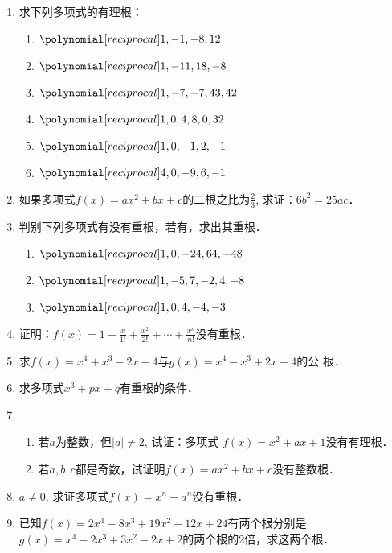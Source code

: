 \begin{enumerate}
    \item 求下列多项式的有理根：
\begin{multicols}{2}
\begin{enumerate}
    \item $\poly{1,-1,-8,12}$
    \item $\poly{1,-11,18,-8}$
    \item $\poly{1,-7,-7,43,42}$
    \item $\poly{1,0,4,8,0,32}$
    \item $\poly{1,0,-1,2,-1}$
    \item $\poly{4,0,-9,6,-1}$
\end{enumerate}
\end{multicols}

\item 如果多项式$f(x)=ax^2+bx+c$的二根之比为$\frac{2}{3}$, 求证：$6b^2=25ac$．

\item 判别下列多项式有没有重根，若有，求出其重根．
\begin{enumerate}
    \item $\poly{1,0,-24,64,-48}$
    \item $\poly{1,-5,7,-2,4,-8}$
    \item $\poly{1,0,4,-4,-3}$
\end{enumerate}

\item 证明：$f(x)=1+\frac{x}{1!}+\frac{x^2}{2!}+\cdots+\frac{x^n}{n!}$没有重根．

\item 求$f(x)=x^4+x^3-2x-4$与$g(x)=x^4-x^3+2x-4$的公
根．

\item 求多项式$x^3+px+q$有重根的条件．

\item \begin{enumerate}
    \item 若$a$为整数，但$|a|\ne 2$, 试证：多项式
$f (x) =x^2+ax+1$没有有理根．
\item 若$a,b,c$都是奇数，试证明$f(x)=ax^2+bx+c$没有整数根．
\end{enumerate}


\item $a\ne 0$, 求证多项式$f(x)=x^n-a^n$没有重根．

\item 已知$f(x)=2x^4-8x^3+19x^2-12x+24$有两个根分别是
$g(x)=x^4-2x^3+3x^2-2x+2$的两个根的2倍，求这两个根．


\end{enumerate}
